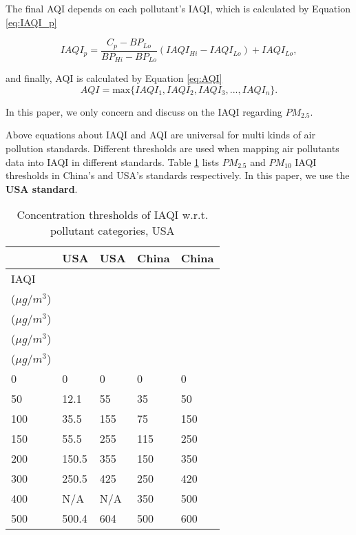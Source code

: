 \documentclass[
twocolumn,
]{ceurart}
\begin{document}
The final AQI depends on each pollutant's IAQI, which is calculated by Equation \ref{eq:IAQI_p}

\begin{equation}
    \label{eq:IAQI_p}
    IAQI_p = \frac{C_p-BP_{Lo}}{BP_{Hi}-BP_{Lo}}(IAQI_{Hi}-IAQI_{Lo})+IAQI_{Lo},
\end{equation}

and finally, AQI is calculated by Equation \ref{eq:AQI}
\begin{equation}
    \label{eq:AQI}
    AQI = \text{max}\{IAQI_{1}, IAQI_{2}, IAQI_{3}, ..., IAQI_{n}\}.
\end{equation}

In this paper, we only concern and discuss on the IAQI regarding $PM_{2.5}$.



Above equations about IAQI and AQI are universal for multi kinds of air pollution standards. Different thresholds are used when mapping air pollutants data into IAQI in different standards. Table \ref{table:IAQI_thresholds} lists $PM_{2.5}$ and $PM_{10}$ IAQI thresholds in China's and USA's standards respectively. In this paper, we use the \textbf{USA standard}. 

\begin{table}[!htbp]
    \centering
    \caption{Concentration thresholds of IAQI w.r.t. pollutant categories, USA}
    \label{table:IAQI_thresholds}
    \begin{tabular}{l|l|l|l|l}
        \hline
        \hline
        \  & USA & USA & China & China \\ \hline
        IAQI & \makecell[c]{$PM_{2.5}$ \\ ($\mu g/m^3$)} & \makecell[c]{$PM_{10}$ \\ ($\mu g/m^3$)} & \makecell[c]{$PM_{2.5}$ \\ ($\mu g/m^3$)} & \makecell[c]{$PM_{10}$ \\ ($\mu g/m^3$)} \\ \hline
        0    & 0     & 0   & 0   & 0   \\ \hline
        50   & 12.1  & 55  & 35  & 50  \\ \hline
        100  & 35.5  & 155 & 75  & 150 \\ \hline
        150  & 55.5  & 255 & 115 & 250 \\ \hline
        200  & 150.5 & 355 & 150 & 350 \\ \hline
        300  & 250.5 & 425 & 250 & 420 \\ \hline
        400  & N/A   & N/A & 350 & 500 \\ \hline
        500  & 500.4 & 604 & 500 & 600 \\ \hline
        \hline
    \end{tabular}
\end{table}
\end{document}
